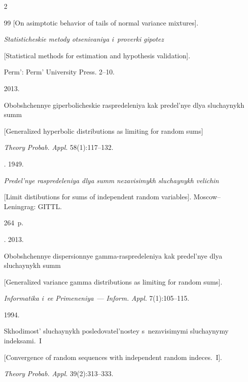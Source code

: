 \begin{multicols}{2}
{{\begin{thebibliography}{99}
[On asimptotic behavior of tails of normal variance mixtures].


\textit{Statisticheskie metody otsenivaniya i~proverki gipotez} 


[Statistical methods for estimation and hypothesis validation]. 


Perm': Perm' University Press. 2--10.





  2013.


Obobshchennye giperbolicheskie raspredeleniya kak predel'nye dlya sluchaynykh summ


[Generalized hyperbolic distributions as limiting for random sums]


\textit{Theory Probab. Appl.} 58(1):117--132.







. 1949. 


\textit{Predel'nye raspredeleniya dlya summ nezavisimykh sluchaynykh velichin} 


[Limit distibutions for sums of independent random variables]. Moscow--Leningrag: GITTL.


264~p.





 . 2013.


Obobshchennye dispersionnye gamma-raspredeleniya kak predel'nye dlya sluchaynykh summ


[Generalized variance gamma distributions as limiting for random sums].


\textit{Informatika i~ee Primeneniya}~--- \textit{Inform. Appl.} 7(1):105--115.





  1994. 


Skhodimost' sluchaynykh posledovatel'nostey s~nezavisimymi sluchaynymy indeksami.~I 


[Convergence of random sequences with independent random indeces.~I]. 


\textit{Theory Probab. Appl.} 39(2):313--333.






\end{thebibliography}}}
\end{multicols}
